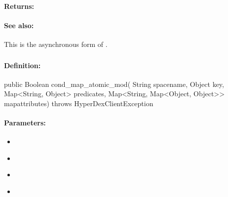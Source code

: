 \paragraph{Returns:}


\paragraph{See also:}  This is the asynchronous form of .

\pagebreak
\subsubsection{}
\label{api:java:cond_map_atomic_mod}


\paragraph{Definition:}
\begin{javacode}
public Boolean cond_map_atomic_mod(
        String spacename,
        Object key,
        Map<String, Object> predicates,
        Map<String, Map<Object, Object>> mapattributes) throws HyperDexClientException
\end{javacode}

\paragraph{Parameters:}
\begin{itemize}[noitemsep]
\item {}\\

\item {}\\

\item {}\\

\item {}\\

\end{itemize}

